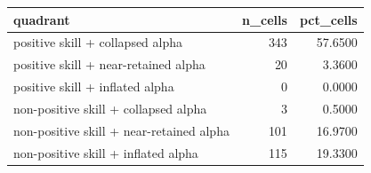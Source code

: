 \begin{tabular}{lrr}
\toprule
quadrant & n\_cells & pct\_cells \\
\midrule
positive skill + collapsed alpha & 343 & 57.6500 \\
positive skill + near-retained alpha & 20 & 3.3600 \\
positive skill + inflated alpha & 0 & 0.0000 \\
non-positive skill + collapsed alpha & 3 & 0.5000 \\
non-positive skill + near-retained alpha & 101 & 16.9700 \\
non-positive skill + inflated alpha & 115 & 19.3300 \\
\bottomrule
\end{tabular}

